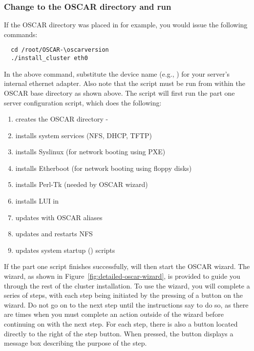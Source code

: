 \subsubsection{Change to the OSCAR directory and run }

\begchange
If the OSCAR directory was placed in  for example, you
would issue the following commands:

\begin{verbatim}
  cd /root/OSCAR-\oscarversion
  ./install_cluster eth0
\end{verbatim}
\endchange
  
\begchange
In the above command, substitute the device name 
\endchange
(e.g., )
for your server's internal ethernet adapter. Also note that the
 script must be run from within the OSCAR base
directory as shown above. The script will first run the part one
server configuration script, which does the following:

\begin{enumerate}
\item creates the OSCAR directory - 
\item installs system services (NFS, DHCP, TFTP)
\item installs Syslinux (for network booting using PXE)
\item installs Etherboot (for network booting using floppy disks)
\item installs Perl-Tk (needed by OSCAR wizard)
\item installs LUI in 
\item updates  with OSCAR aliases
\item updates  and restarts NFS
\item updates system startup () scripts
\end{enumerate}
  
If the part one script finishes successfully, 
will then start the OSCAR wizard. The wizard, as shown in
Figure~\ref{fig:detailed-oscar-wizard}, is provided to guide you
through the rest of the cluster installation.  To use the wizard, you
will complete a series of steps, with each step being initiated by the
pressing of a button on the wizard. Do not go on to the next step
until the instructions say to do so, as there are times when you must
complete an action outside of the wizard before continuing on with the
next step. For each step, there is also a  button located
directly to the right of the step button. When pressed, the
 button displays a message box describing the purpose of
the step.

